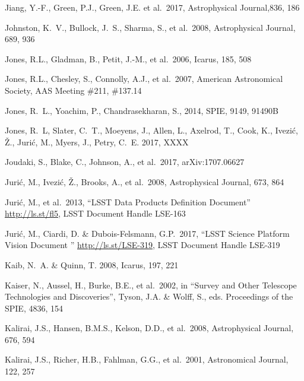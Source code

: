 \documentclass[twocolumn]{aastex61}
\begin{document}
\begin{thebibliography}{}
 Jiang, Y.-F., Green, P.J., Green, J.E. et al.~2017, Astrophysical Journal,836, 186

 Johnston, K.~V., Bullock, J.~S., Sharma, S., et al.~2008, Astrophysical Journal, 689, 936

 Jones, R.L., Gladman, B., Petit, J.-M., et al.~2006, Icarus, 185, 508

 Jones, R.L., Chesley, S., Connolly, A.J., et al.~2007, American Astronomical Society, AAS Meeting \#211, \#137.14

 Jones, R.~L., Yoachim, P., Chandrasekharan, S., 2014, SPIE, 9149, 91490B

 Jones, R.~L, Slater, C.~T., Moeyens, J., Allen, L., Axelrod, T., Cook, K., Ivezi\'{c}, \v{Z}.,  Juri\'{c}, M., Myers, J., Petry, C.~E. 2017, XXXX

 Joudaki, S., Blake, C., Johnson, A., et al.~2017, arXiv:1707.06627

 Juri\'{c}, M., Ivezi\'c, \v Z., Brooks, A., et al.~2008, Astrophysical Journal, 673, 864

 Juri\'{c}, M., et al.~2013, ``LSST Data Products Definition Document'' \url{http://ls.st/fl5}, LSST Document Handle LSE-163

 Juri\'{c}, M., Ciardi, D. \& Dubois-Felsmann, G.P.~2017, ``LSST Science Platform Vision Document '' \url{http://ls.st/LSE-319}, LSST Document Handle LSE-319

 Kaib, N.~A. \& Quinn, T. 2008, Icarus, 197, 221

 Kaiser, N., Aussel, H., Burke, B.E., et al.~2002, in ``Survey and Other Telescope Technologies and Discoveries'', Tyson, J.A. \& Wolff, S., eds. Proceedings of the SPIE, 4836, 154

 Kalirai, J.S., Hansen, B.M.S., Kelson, D.D., et al.~2008, Astrophysical Journal, 676, 594

 Kalirai, J.S., Richer, H.B., Fahlman, G.G., et al.~2001, Astronomical Journal, 122, 257


\end{thebibliography}
\end{document}
